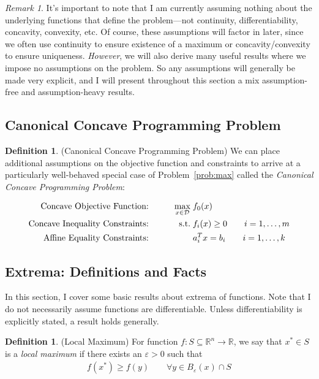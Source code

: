 \documentclass[12pt]{book}
\numberwithin{equation}{section} %
\theoremstyle{plain}
\theoremstyle{definition}
\newtheorem{defn}[thm]{Definition}
\theoremstyle{remark}
\newtheorem*{rmk}{Remark}
\newcommand{\R}{\mathbb{R}}
\newcommand{\Rn}{\mathbb{R}^n}
\begin{document}
\begin{rmk}
It's important to note that I am currently assuming nothing about
the underlying functions that define the problem---not continuity,
differentiability, concavity, convexity, etc. Of course, these assumptions will factor in later, since we often use continuity to
ensure existence of a maximum or concavity/convexity to ensure
uniqueness. \emph{However}, we will also derive many useful results
where we impose no assumptions on the problem. So any assumptions will
generally be made very explicit, and I will present throughout this
section a mix assumption-free and assumption-heavy results.
\end{rmk}

\subsection{Canonical Concave Programming Problem}


\begin{defn}(Canonical Concave Programming Problem)
We can place additional assumptions on the objective function and
constraints to arrive at a particularly well-behaved special case of
Problem~\ref{prob:max} called the
\emph{Canonical Concave Programming Problem}:
\end{defn}
\begin{alignat}{3}
  \text{Concave Objective Function:} \qquad
    && \max_{x\in\mathcal{D}} \; &f_0(x) \label{prob:maxconcave}\\
  \text{Concave Inequality Constraints:} \qquad
    && \text{s.t.} \; &f_i(x) \geq 0 \qquad i = 1,\ldots, m\notag \\
  \text{Affine Equality Constraints:} \qquad
    && &a_i^T x = b_i \qquad i = 1,\ldots,k\notag
\end{alignat}

\subsection{Extrema: Definitions and Facts}
\label{sec:extrema}

In this section, I cover some basic results about extrema of functions.
Note that I do not necessarily assume functions are differentiable.
Unless differentiability is explicitly stated, a result holds generally.

\begin{defn}{(Local Maximum)}
For function $f:S\subseteq\Rn\rightarrow \R$, we say that $x^* \in
S$ is a \emph{local maximum} if there exists an $\varepsilon>0$ such
that
\begin{align*}
  f(x^*)\geq f(y)
  \qquad \forall y \in B_\varepsilon(x) \cap S
\end{align*}
\end{defn}
\end{document}
